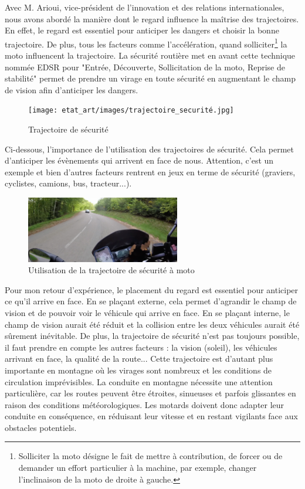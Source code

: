 Avec M. Arioui, vice-président de l’innovation et des relations internationales, nous avons abordé la manière dont le regard influence la maîtrise des trajectoires. En effet, le regard est essentiel pour anticiper les dangers et choisir la bonne trajectoire. De plus, tous les facteurs comme l'accélération, quand solliciter\footnote{Solliciter la moto désigne le fait de mettre à contribution, de forcer ou de demander un effort particulier à la machine, par exemple, changer l'inclinaison de la moto de droite à gauche.} la moto influencent la trajectoire. 
La sécurité routière\cite{trajectoire_securite} met en avant cette technique nommée EDSR pour "Entrée, Découverte, Sollicitation de la moto, Reprise de stabilité" permet de prendre un virage en toute sécurité en augmentant le champ de vision afin d'anticiper les dangers. 
\begin{figure}[H]
    \centering
    \texttt{[image: etat\_art/images/trajectoire\_securité.jpg]} 
    \caption{Trajectoire de sécurité}
\end{figure}
Ci-dessous, l'importance de l'utilisation des trajectoires de sécurité. Cela permet d'anticiper les évènements qui arrivent en face de nous. Attention, c’est un exemple et bien d’autres facteurs rentrent en jeux en terme de sécurité  (graviers, cyclistes, camions, bus, tracteur...).
\begin{figure}[H]
    \centering
    \includegraphics[width=0.6\textwidth]{etat_art/images/morvan.png} 
    \caption{Utilisation de la trajectoire de sécurité à moto}
\end{figure}
Pour mon retour d'expérience, le placement du regard est essentiel pour anticiper ce qu'il arrive en face. En se plaçant externe, cela permet d'agrandir le champ de vision et de pouvoir voir le véhicule qui arrive en face. En se plaçant interne, le champ de vision aurait été réduit et la collision entre les deux véhicules aurait été sûrement inévitable. De plus, la trajectoire de sécurité n'est pas toujours possible, il faut prendre en compte les autres facteurs : la vision (soleil), les véhicules arrivant en face, la qualité de la route...
Cette trajectoire est d'autant plus importante en montagne où les virages sont nombreux et les conditions de circulation imprévisibles. La conduite en montagne nécessite une attention particulière, car les routes peuvent être étroites, sinueuses et parfois glissantes en raison des conditions météorologiques. Les motards doivent donc adapter leur conduite en conséquence, en réduisant leur vitesse et en restant vigilants face aux obstacles potentiels.
